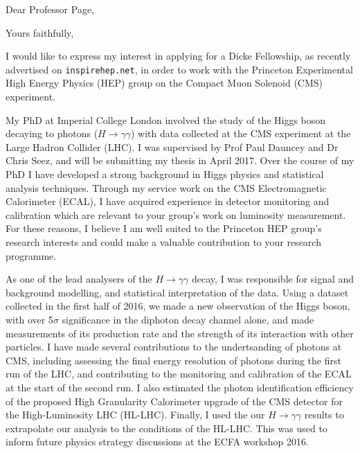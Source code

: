 \documentclass[11pt,a4paper,sans]{moderncv}        %
\begin{document}
\date{\today}
\opening{Dear Professor Page,}
\closing{Yours faithfully,}
\makelettertitle

I would like to express my interest in applying for a Dicke Fellowship, as recently advertised on \texttt{inspirehep.net}, in order to work with the Princeton Experimental High Energy Physics (HEP) group on the Compact Muon Solenoid (CMS) experiment.  

My PhD at Imperial College London involved the study of the Higgs boson decaying to photons ($H \rightarrow \gamma \gamma$) with data collected at the CMS experiment at the Large Hadron Collider (LHC). I was supervised by Prof Paul Dauncey and Dr Chris Seez, and will be submitting my thesis in April 2017. Over the course of my PhD I have developed a strong background in Higgs physics and statistical analysis techniques. Through my service work on the CMS Electromagnetic Calorimeter (ECAL), I have acquired experience in detector monitoring and calibration which are relevant to your group's work on luminosity measurement. For these reasons, I believe I am well suited to the Princeton HEP group's research interests and could make a valuable contribution to your research programme.

As one of the lead analysers of the $H \rightarrow \gamma \gamma$ decay, I was responsible for signal and background modelling, and statistical interpretation of the data. Using a dataset collected in the first half of 2016, we made a new observation of the Higgs boson, with over 5$\sigma$ significance in the diphoton decay channel alone, and  made measurements of its production rate and the strength of its interaction with other particles.
I have made several contributions to the undertsanding of photons at CMS, including assessing the final energy resolution of photons during the first run of the LHC, and contributing to the monitoring and calibration of the ECAL at the start of the second run. I also estimated the photon identification efficiency of the proposed High Granularity Calorimeter upgrade of the CMS detector for the High-Luminosity LHC (HL-LHC). Finally, I used the our $H \rightarrow \gamma \gamma$ results to extrapolate our analysis to the conditions of the HL-LHC. This was used to inform future physics strategy discussions at the ECFA workshop 2016.
\end{document}
